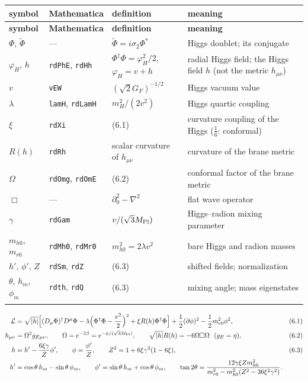 \documentclass[10pt,a4paper]{article}
\begin{document}
{\footnotesize
\begin{longtable}{>{\raggedright\arraybackslash}p{}>{\raggedright\arraybackslash}p{}>{\raggedright\arraybackslash}p{}>{\raggedright\arraybackslash}p{}}
\toprule
\textbf{symbol} & \textbf{Mathematica} & \textbf{definition} & \textbf{meaning} \\
\midrule\endfirsthead
\toprule
\textbf{symbol} & \textbf{Mathematica} & \textbf{definition} & \textbf{meaning} \\
\midrule\endhead
\endfoot
\bottomrule\endlastfoot
$\Phi$, $\tilde\Phi$ & — & $\tilde\Phi=i\sigma_2\Phi^*$ & Higgs doublet; its conjugate \\
$\varphi_H$, $h$ & \texttt{rdPhE}, \texttt{rdHh} & $\Phi^\dagger\Phi=\varphi_H^2/2$, $\varphi_H=v+h$ & radial Higgs field; the Higgs field $h$ (not the metric $h_{\mu\nu}$) \\
$v$ & \texttt{vEW} & $(\sqrt2G_F)^{-1/2}$ & Higgs vacuum value \\
$\lambda$ & \texttt{lamH}, \texttt{rdLamH} & $m_H^2/(2v^2)$ & Higgs quartic coupling \\
$\xi$ & \texttt{rdXi} & (6.1) & curvature coupling of the Higgs ($\frac16$: conformal) \\
$R(h)$ & \texttt{rdRh} & scalar curvature of $h_{\mu\nu}$ & curvature of the brane metric \\
$\Omega$ & \texttt{rdOmg}, \texttt{rdOmE} & (6.2) & conformal factor of the brane metric \\
$\Box$ & — & $\partial_0^2-\nabla^2$ & flat wave operator \\
$\gamma$ & \texttt{rdGam} & $v/(\sqrt3M_{\rm Pl})$ & Higgs–radion mixing parameter \\
$m_{h0}$, $m_{r0}$ & \texttt{rdMh0}, \texttt{rdMr0} & $m_{h0}^2=2\lambda v^2$ & bare Higgs and radion masses \\
$h'$, $\phi'$, $Z$ & \texttt{rdSm}, \texttt{rdZ} & (6.3) & shifted fields; normalization \\
$\theta$, $h_m$, $\phi_m$ & \texttt{rdth}, \texttt{rdQ} & (6.3) & mixing angle; mass eigenstates \\*
\end{longtable}}
\begin{align*}
\mathcal L&=\sqrt{|h|}\Big[(D_\mu\Phi)^\dagger D^\mu\Phi-\lambda\Big(\Phi^\dagger\Phi-\frac{v^2}2\Big)^2+\xi R(h)\Phi^\dagger\Phi\Big]+\frac12(\partial\phi)^2-\frac12m_{r0}^2\phi^2,&&(6.1) \\
h_{\mu\nu}&=\Omega^2g_{E\mu\nu},\qquad \Omega=e^{-2\beta}=e^{-\phi/(\sqrt3M_{\rm Pl})},\qquad \sqrt{|h|}R(h)=-6\Omega\Box\Omega\ \ (g_E=\eta),&&(6.2) \\
h&=h'-\frac{6\xi\gamma}Z\phi',\qquad \phi=\frac{\phi'}Z,\qquad Z^2=1+6\xi\gamma^2(1-6\xi),&&(6.3) \\
h'&=\cos\theta\,h_m-\sin\theta\,\phi_m,\qquad \phi'=\sin\theta\,h_m+\cos\theta\,\phi_m,\qquad \tan2\theta=\frac{12\gamma\xi Zm_{h0}^2}{m_{r0}^2-m_{h0}^2(Z^2-36\xi^2\gamma^2)} .
\end{align*}
\end{document}
